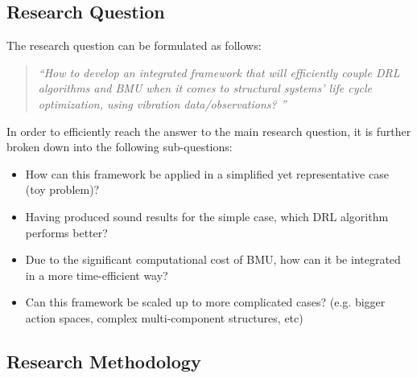 

\subsection{Research Question} \label{researchQ}

The research question can be formulated as follows:

\begin{quote}
    \emph{“How to develop an integrated framework that will efficiently couple \acrfull{DRL} algorithms and \acrfull{BMU} when it comes to structural systems' life cycle optimization, using vibration data/observations? ”}
\end{quote}

In order to efficiently reach the answer to the main research question, it is further broken down into the following sub-questions:
\begin{itemize}
    \item How can this framework be applied in a simplified yet representative case (toy problem)?
    \item Having produced sound results for the simple case, which \gls{DRL} algorithm performs better?
    \item Due to the significant computational cost of \gls{BMU}, how can it be integrated in a more time-efficient way?
    \item Can this framework be scaled up to more complicated cases? (e.g. bigger action spaces, complex multi-component structures, etc)
\end{itemize}

\newpage


\subsection{Research Methodology}

